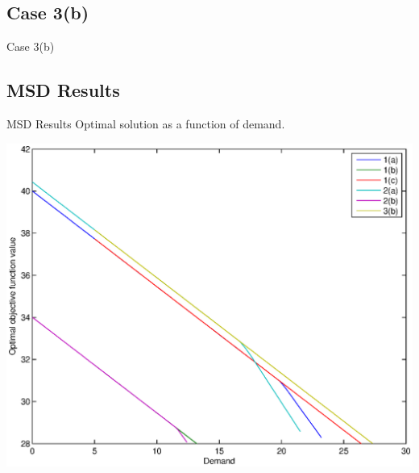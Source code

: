 \documentclass[xcolor=x11names,compress]{beamer}
\renewcommand{\(}{\begin{columns}}
\renewcommand{\)}{\end{columns}}
\newcommand{\<}[1]{\begin{column}{#1}}
\renewcommand{\>}{\end{column}}
\begin{document}
\subsection{Case 3(b)}
\begin{frame}{Case 3(b)}

\begin{figure}[!ht]
\centering
{}
\end{figure}

\end{frame}

\subsection{MSD Results}
\begin{frame}{MSD Results}
Optimal solution as a function of demand.
\begin{center}
\includegraphics[width=.7\textwidth]{../optimize/figs/allzvd.eps}
\end{center}
\end{frame}
\end{document}

